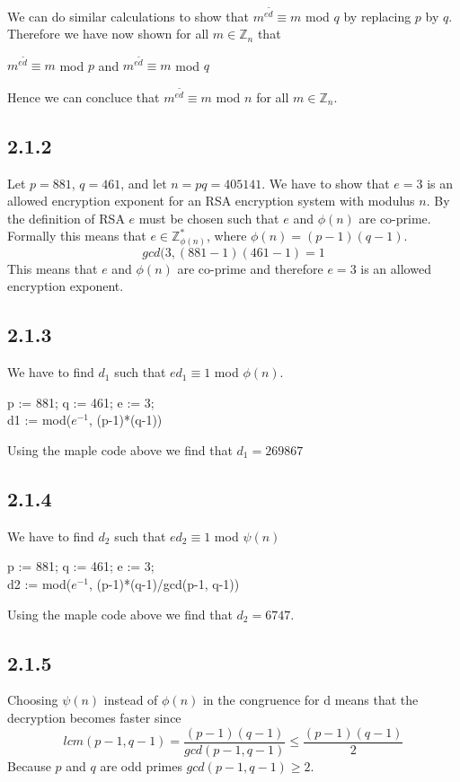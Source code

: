 \documentclass[11pt]{report}
\begin{document}
We can do similar calculations to show that $m^{e\tilde{d}} \equiv m$ mod $q$ by replacing $p$ by $q$.\\
Therefore we have now shown for all $m \in \mathbb{Z}_n$ that
\begin{center}
$m^{e\tilde{d}} \equiv m$ mod $p$ and  $m^{e\tilde{d}} \equiv m$ mod $q$
\end{center}
Hence we can concluce that $m^{e\tilde{d}} \equiv m$ mod $n$ for all $m \in \mathbb{Z}_{n}$.
\subsection*{2.1.2}
Let $p = 881$, $q = 461$, and let $n = pq = 405141$. We have to show that $e = 3$ is an allowed encryption exponent for an RSA encryption system with modulus $n$. By the definition of RSA $e$ must be chosen such that $e$ and $\phi(n)$ are co-prime. Formally this means that $e \in \mathbb{Z}^*_{\phi(n)}$, where $\phi(n) = (p-1)(q-1)$.
$$gcd(3, (881-1)(461-1) = 1$$
This means that $e$ and $\phi(n)$ are co-prime and therefore $e=3$ is an allowed encryption exponent.

\subsection*{2.1.3}
We have to find $d_1$ such that $ed_1 \equiv 1$ mod $\phi(n)$.
\begin{mapleinput}
p := 881; q := 461; e := 3; \\
d1 := mod($e^{-1}$, (p-1)*(q-1))
\end{mapleinput}
Using the maple code above we find that $d_1 = 269867$
\subsection*{2.1.4}
We have to find $d_2$ such that $ed_2 \equiv 1$ mod $\psi(n)$
\begin{mapleinput}
p := 881; q := 461; e := 3; \\
d2 := mod($e^{-1}$, (p-1)*(q-1)/gcd(p-1, q-1))
\end{mapleinput}
Using the maple code above we find that $d_2 = 6747$.
\subsection*{2.1.5}
Choosing $\psi(n)$ instead of $\phi(n)$ in the congruence for d means that the decryption becomes faster since
$$lcm(p-1,q-1)=\frac{(p-1)(q-1)}{gcd(p-1,q-1)} \leq \frac{(p-1)(q-1)}{2}$$
Because $p$ and $q$ are odd primes $gcd(p-1,q-1) \geq 2$. 
\end{document}
